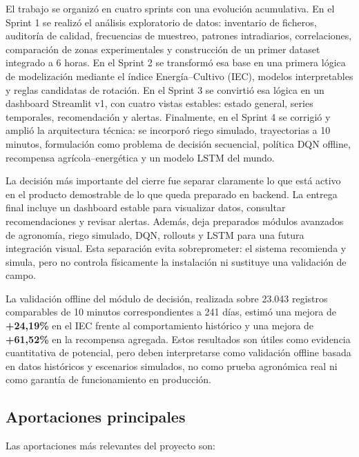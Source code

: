 ﻿\documentclass[11pt,a4paper]{article}
\newcommand{\metric}[1]{\textbf{\color{brandblue}#1}}
\begin{document}
El trabajo se organizó en cuatro sprints con una evolución acumulativa. En el Sprint 1 se realizó el análisis exploratorio de datos: inventario de ficheros, auditoría de calidad, frecuencias de muestreo, patrones intradiarios, correlaciones, comparación de zonas experimentales y construcción de un primer dataset integrado a 6 horas. En el Sprint 2 se transformó esa base en una primera lógica de modelización mediante el índice Energía--Cultivo (IEC), modelos interpretables y reglas candidatas de rotación. En el Sprint 3 se convirtió esa lógica en un dashboard Streamlit v1, con cuatro vistas estables: estado general, series temporales, recomendación y alertas. Finalmente, en el Sprint 4 se corrigió y amplió la arquitectura técnica: se incorporó riego simulado, trayectorias a 10 minutos, formulación como problema de decisión secuencial, política DQN offline, recompensa agrícola--energética y un modelo LSTM del mundo.

La decisión más importante del cierre fue separar claramente lo que está activo en el producto demostrable de lo que queda preparado en backend. La entrega final incluye un dashboard estable para visualizar datos, consultar recomendaciones y revisar alertas. Además, deja preparados módulos avanzados de agronomía, riego simulado, DQN, rollouts y LSTM para una futura integración visual. Esta separación evita sobreprometer: el sistema recomienda y simula, pero no controla físicamente la instalación ni sustituye una validación de campo.

La validación offline del módulo de decisión, realizada sobre 23.043 registros comparables de 10 minutos correspondientes a 241 días, estimó una mejora de \metric{+24,19\%} en el IEC frente al comportamiento histórico y una mejora de \metric{+61,52\%} en la recompensa agregada. Estos resultados son útiles como evidencia cuantitativa de potencial, pero deben interpretarse como validación offline basada en datos históricos y escenarios simulados, no como prueba agronómica real ni como garantía de funcionamiento en producción.


\subsection*{Aportaciones principales}

Las aportaciones más relevantes del proyecto son:
\end{document}
